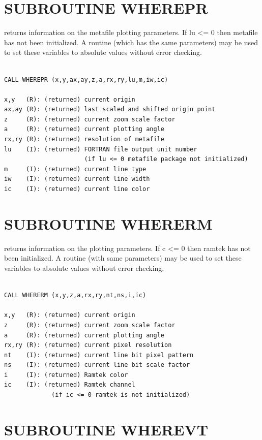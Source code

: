 \documentclass[11pt]{report}
\begin{document}
\section{SUBROUTINE WHEREPR}

  returns information on the metafile plotting parameters.  If lu <= 0
then metafile has not been initialized.  A routine  (which
has the same parameters) may be used
to set these variables to absolute values without error checking.
\begin{verbatim}

CALL WHEREPR (x,y,ax,ay,z,a,rx,ry,lu,m,iw,ic)

x,y   (R): (returned) current origin
ax,ay (R): (returned) last scaled and shifted origin point
z     (R): (returned) current zoom scale factor
a     (R): (returned) current plotting angle
rx,ry (R): (returned) resolution of metafile
lu    (I): (returned) FORTRAN file output unit number 
                      (if lu <= 0 metafile package not initialized)
m     (I): (returned) current line type
iw    (I): (returned) current line width
ic    (I): (returned) current line color
\end{verbatim}

\section{SUBROUTINE WHERERM}

 returns information on the  plotting parameters.  If c <= 0
then ramtek has not been initialized.   A routine  (with
same parameters) may be used
to set these variables to absolute values without error checking.
\begin{verbatim}

CALL WHERERM (x,y,z,a,rx,ry,nt,ns,i,ic)

x,y   (R): (returned) current origin
z     (R): (returned) current zoom scale factor
a     (R): (returned) current plotting angle
rx,ry (R): (returned) current pixel resolution
nt    (I): (returned) current line bit pixel pattern
ns    (I): (returned) current line bit scale factor
i     (I): (returned) Ramtek color 
ic    (I): (returned) Ramtek channel
             (if ic <= 0 ramtek is not initialized)
\end{verbatim}

\section{SUBROUTINE WHEREVT}
\end{document}
